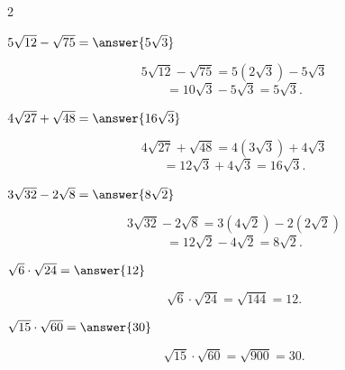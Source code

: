 \documentclass{ximera}
\begin{document}
\begin{oefening}[Wortels]{\oefB\ESS}
\begin{multicols}{2}
        
        \begin{question}
        $5\sqrt{12}-\sqrt{75}=\answer{5\sqrt3}$
        
        \begin{oplossing}
        \[
        5\sqrt{12}-\sqrt{75}
        =5(2\sqrt3)-5\sqrt3
        \]
        \[
        =10\sqrt3-5\sqrt3
        =5\sqrt3.
        \]
        \end{oplossing}
        \end{question}
        
        
        \begin{question}
        $4\sqrt{27}+\sqrt{48}=\answer{16\sqrt3}$
        
        \begin{oplossing}
        \[
        4\sqrt{27}+\sqrt{48}
        =4(3\sqrt3)+4\sqrt3
        \]
        \[
        =12\sqrt3+4\sqrt3
        =16\sqrt3.
        \]
        \end{oplossing}
        \end{question}
        
        
        \begin{question}
        $3\sqrt{32}-2\sqrt8=\answer{8\sqrt2}$
        
        \begin{oplossing}
        \[
        3\sqrt{32}-2\sqrt8
        =3(4\sqrt2)-2(2\sqrt2)
        \]
        \[
        =12\sqrt2-4\sqrt2
        =8\sqrt2.
        \]
        \end{oplossing}
        \end{question}
        
        
        \begin{question}
        $\sqrt6\cdot\sqrt{24}=\answer{12}$
        
        \begin{oplossing}
        \[
        \sqrt6\cdot\sqrt{24}
        =\sqrt{144}
        =12.
        \]
        \end{oplossing}
        \end{question}
        
        
        \begin{question}
        $\sqrt{15}\cdot\sqrt{60}=\answer{30}$
        
        \begin{oplossing}
        \[
        \sqrt{15}\cdot\sqrt{60}
        =\sqrt{900}
        =30.
        \]
        \end{oplossing}
        \end{question}
        

\end{multicols}
\end{oefening}
\end{document}
